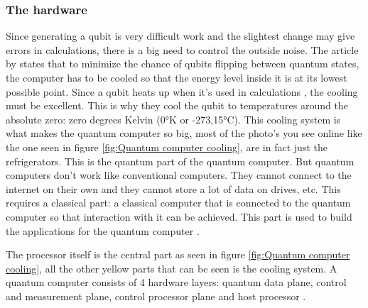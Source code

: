 \subsubsection{The hardware}
Since generating a qubit is very difficult work and the slightest change may give errors in calculations, there is a big need to control the outside noise.
The article by \textcite{Cooling} states that to minimize the chance of qubits flipping between quantum states, the computer has to be cooled so that the energy level inside it is at its lowest possible point.
Since a qubit heats up when it's used in calculations \autocite{Cooling}, the cooling must be excellent. This is why they cool the qubit to temperatures around the absolute zero: zero degrees Kelvin (0°K or -273,15°C).
This cooling system is what makes the quantum computer so big, most of the photo's you see online like the one seen in figure \ref{fig:Quantum computer cooling}, are in fact just the refrigerators. This is the quantum part of the quantum computer. But quantum computers don't work like conventional computers. They cannot connect to the internet on their own and they cannot store a lot of data on drives, etc.
This requires a classical part: a classical computer that is connected to the quantum computer so that interaction with it can be achieved. This part is used to build the applications for the quantum computer \autocite{qhardware}.

The processor itself is the central part as seen in figure \ref*{fig:Quantum computer cooling}, all the other yellow parts that can be seen is the cooling system.
A quantum computer consists of 4 hardware layers: quantum data plane, control and measurement plane, control processor plane and host processor \autocite{qhardware}.


